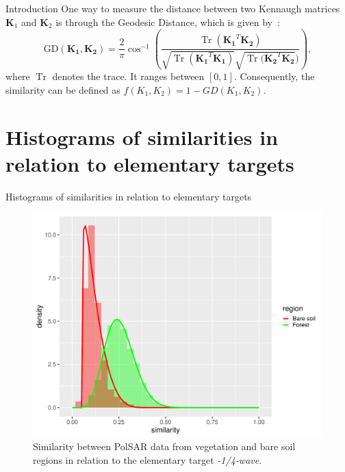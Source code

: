 \documentclass[10pt]{beamer}
\newcommand{\Tr}{\operatorname{Tr}}
\begin{document}
\begin{frame}[fragile]{Introduction}
    One way to measure the distance between two Kennaugh matrices $\bm K_1$ and $\bm K_2$ is through the Geodesic Distance, which is given by~\cite{ClassificationPolSARGeodesic}: 
    \begin{displaymath}
    \text{GD}(\mathbf{K_1}, \mathbf{K_2}) = \frac{2}{\pi} \cos^{-1} \left(\frac{\Tr(\mathbf{K_1}^T \mathbf{K_2})}{\sqrt{\Tr(\mathbf{K_1}^T \mathbf{K_1})} \sqrt{\Tr(\mathbf{K_2}^T \mathbf{K_2}})} \right),
    \end{displaymath}
    where $\Tr$ denotes the trace. It ranges between $[0,1]$. Consequently, the similarity can be defined as $f(K_1, K_2) = 1 - GD(K_1, K_2)$.
\end{frame}

\section[Histograms]{Histograms of similarities in relation to elementary targets}

\begin{frame}[fragile]{Histograms of similarities in relation to elementary targets}

\begin{figure}
    \centering
    \includegraphics[width = .6\linewidth]{wvn.pdf}
    \caption{Similarity between PolSAR data from vegetation and bare soil regions in relation to the elementary target \textit{-1/4-wave}.}
    \label{fig:wvn}
\end{figure}
    
\end{frame}
\end{document}
